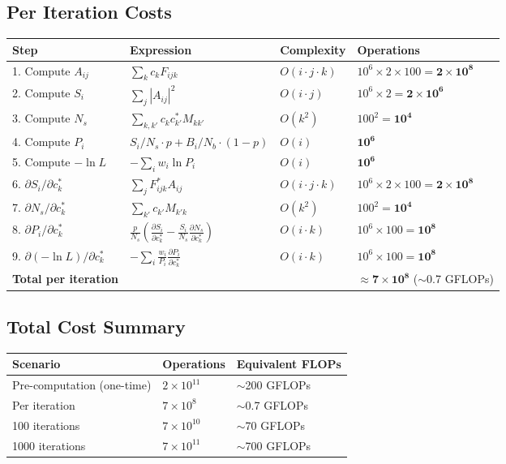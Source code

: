 \documentclass[11pt,a4paper]{article}
\begin{document}
\subsection{Per Iteration Costs}

\begin{center}
\begin{tabular}{@{}llll@{}}
\toprule
\textbf{Step} & \textbf{Expression} & \textbf{Complexity} & \textbf{Operations} \\ \midrule
1. Compute $A_{ij}$ & $\sum_{k} c_k F_{ijk}$ & $O(i \cdot j \cdot k)$ & $10^6 \times 2 \times 100 = \mathbf{2 \times 10^8}$ \\
2. Compute $S_i$ & $\sum_{j} |A_{ij}|^2$ & $O(i \cdot j)$ & $10^6 \times 2 = \mathbf{2 \times 10^6}$ \\
3. Compute $N_s$ & $\sum_{k,k'} c_k c_{k'}^* M_{kk'}$ & $O(k^2)$ & $100^2 = \mathbf{10^4}$ \\
4. Compute $P_i$ & $S_i/N_s \cdot p + B_i/N_b \cdot (1-p)$ & $O(i)$ & $\mathbf{10^6}$ \\
5. Compute $-\ln L$ & $-\sum_i w_i \ln P_i$ & $O(i)$ & $\mathbf{10^6}$ \\
6. $\partial S_i/\partial c_k^*$ & $\sum_{j} F_{ijk}^* A_{ij}$ & $O(i \cdot j \cdot k)$ & $10^6 \times 2 \times 100 = \mathbf{2 \times 10^8}$ \\
7. $\partial N_s/\partial c_k^*$ & $\sum_{k'} c_{k'} M_{k'k}$ & $O(k^2)$ & $100^2 = \mathbf{10^4}$ \\
8. $\partial P_i/\partial c_k^*$ & $\frac{p}{N_s}\!\left(\frac{\partial S_i}{\partial c_k^*} - \frac{S_i}{N_s}\frac{\partial N_s}{\partial c_k^*}\right)$ & $O(i \cdot k)$ & $10^6 \times 100 = \mathbf{10^8}$ \\
9. $\partial(-\ln L)/\partial c_k^*$ & $-\sum_i \frac{w_i}{P_i} \frac{\partial P_i}{\partial c_k^*}$ & $O(i \cdot k)$ & $10^6 \times 100 = \mathbf{10^8}$ \\
\textbf{Total per iteration} & & & $\mathbf{\approx 7 \times 10^8}$ ($\sim$0.7 GFLOPs) \\ \bottomrule
\end{tabular}
\end{center}

\subsection{Total Cost Summary}

\begin{center}
\begin{tabular}{@{}lll@{}}
\toprule
\textbf{Scenario} & \textbf{Operations} & \textbf{Equivalent FLOPs} \\ \midrule
Pre-computation (one-time) & $2 \times 10^{11}$ & $\sim$200 GFLOPs \\
Per iteration & $7 \times 10^8$ & $\sim$0.7 GFLOPs \\
100 iterations & $7 \times 10^{10}$ & $\sim$70 GFLOPs \\
1000 iterations & $7 \times 10^{11}$ & $\sim$700 GFLOPs \\ \bottomrule
\end{tabular}
\end{center}
\end{document}

